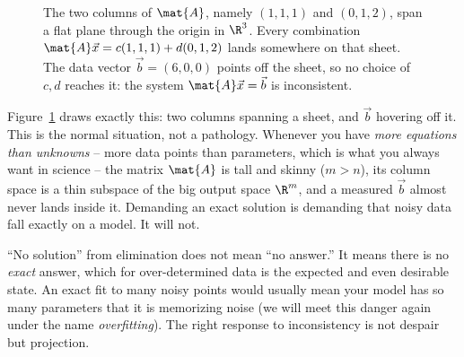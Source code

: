 \begin{figure}[H]
\centering
{}
\caption{The two columns of $\mat{A}$, namely $(1,1,1)$ and $(0,1,2)$, span a flat plane through
the origin in $\R^3$. Every combination $\mat{A}\vec{x}=c(1,1,1)+d(0,1,2)$ lands somewhere on that
sheet. The data vector $\vec{b}=(6,0,0)$ points off the sheet, so no choice of $c,d$ reaches it:
the system $\mat{A}\vec{x}=\vec{b}$ is inconsistent.}
\label{ch19:plane-off}
\end{figure}

Figure~\ref{ch19:plane-off} draws exactly this: two columns spanning a sheet, and $\vec{b}$
hovering off it. This is the normal situation, not a pathology. Whenever you have \emph{more
equations than unknowns} -- more data points than parameters, which is what you always want in science -- the
matrix $\mat{A}$ is tall and skinny ($m>n$), its column space is a thin subspace of the big
output space $\R^m$, and a measured $\vec{b}$ almost never lands inside it. Demanding an exact
solution is demanding that noisy data fall exactly on a model. It will not.

\begin{trapbox}
``No solution'' from elimination does not mean ``no answer.'' It means there is no \emph{exact}
answer, which for over-determined data is the expected and even desirable state. An exact fit to
many noisy points would usually mean your model has so many parameters that it is memorizing noise
(we will meet this danger again under the name \emph{overfitting}). The right response to
inconsistency is not despair but projection.
\end{trapbox}

